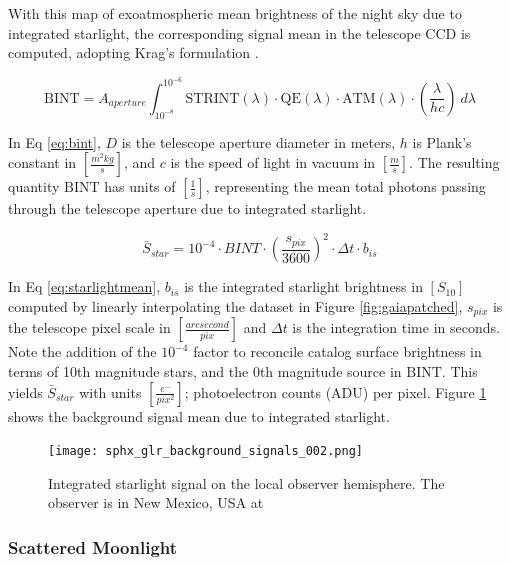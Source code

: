 With this map of exoatmospheric mean brightness of the night sky due to integrated
starlight, the corresponding signal mean in the telescope CCD is computed, adopting Krag's formulation \cite{krag2003}.

\begin{equation} \label{eq:bint}
 \textrm{BINT} = A_{aperture}
  \int_{10^{-8}}^{10^{-6}}{ \textrm{STRINT}(\lambda) \cdot \textrm{QE}(\lambda) \cdot \textrm{ATM}(\lambda)
  \cdot \left( \frac{\lambda}{h c} \right) \: d\lambda}  
\end{equation}

In Eq \ref{eq:bint}, $D$ is the telescope aperture diameter in meters, $h$ is Plank's constant in
$\left[ \frac{m^2 kg}{s} \right]$, and $c$
is the speed of light in vacuum in $\left[ \frac{m}{s} \right]$. The resulting quantity
$\textrm{BINT}$ has units of $\left[ \frac{1}{s} \right]$, representing the mean total photons passing
through the telescope aperture due to integrated starlight. 

\begin{equation} \label{eq:starlightmean}
  \bar{S}_{star} = 10^{-4} \cdot BINT \cdot \left( \frac{s_{pix}}{3600} \right)^2 \cdot \Delta t \cdot
  b_{is}
\end{equation}

In Eq \ref{eq:starlightmean}, $b_{is}$ is the integrated starlight brightness in $\left[ S_{10}
\right]$ computed by linearly interpolating the dataset in Figure \ref{fig:gaiapatched}, $s_{pix}$ is the telescope pixel scale in $\left[ \frac{arcsecond}{pix} \right]$ and $\Delta t$ is the integration time in seconds. Note the addition of the $10^{-4}$ factor to reconcile catalog surface brightness in terms of 10th magnitude stars, and the 0th magnitude source in $\textrm{BINT}$. This yields $\bar{S}_{star}$ with units $\left[ \frac{e^-}{pix^2} \right]$; photoelectron counts (ADU) per pixel. Figure \ref{fig:starlight_hemi} shows the background signal mean due to integrated starlight.

\begin{figure}[ht]
  \centering
  \texttt{[image: sphx\_glr\_background\_signals\_002.png]}
  \caption{Integrated starlight signal on the local observer hemisphere. The observer is in New Mexico, USA at
  \pogslla}
  \label{fig:starlight_hemi}
\end{figure}

\subsubsection{Scattered Moonlight}

